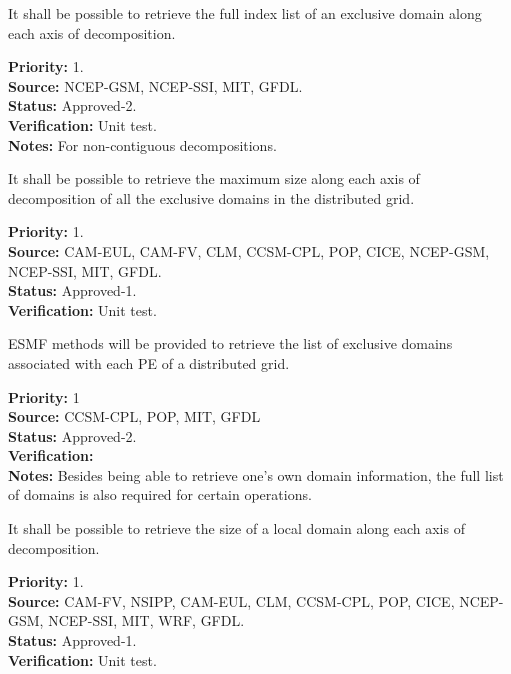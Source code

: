 It shall be possible to retrieve the full index list of 
an exclusive domain along each axis of decomposition.

\begin{reqlist}
{\bf Priority:} 1. \\ 
{\bf Source:} NCEP-GSM, NCEP-SSI, MIT, GFDL. \\
{\bf Status:} Approved-2. \\
{\bf Verification:} Unit test.\\
{\bf Notes:} For non-contiguous decompositions.
\end{reqlist}


It shall be possible to retrieve the maximum size along each axis of
decomposition of all the exclusive domains in the distributed grid. 

\begin{reqlist}
{\bf Priority:} 1. \\ 
{\bf Source:} CAM-EUL, CAM-FV, CLM, CCSM-CPL, POP, CICE, NCEP-GSM, NCEP-SSI, MIT, GFDL. \\
{\bf Status:} Approved-1. \\
{\bf Verification:} Unit test.
\end{reqlist}


ESMF methods will be provided to retrieve the list of exclusive
domains associated with each PE of a distributed grid.

\begin{reqlist}
{\bf Priority:} 1 \\ 
{\bf Source:} CCSM-CPL, POP, MIT, GFDL \\
{\bf Status:} Approved-2. \\
{\bf Verification:} \\
{\bf Notes:} Besides being able to retrieve one's own domain
  information, the full list of domains is also required for certain
  operations.
\end{reqlist}



It shall be possible to retrieve the size of a local domain
along each axis of decomposition.

\begin{reqlist}
{\bf Priority:} 1. \\ 
{\bf Source:} CAM-FV, NSIPP, CAM-EUL, CLM, CCSM-CPL, POP, CICE, NCEP-GSM, NCEP-SSI, MIT, WRF, GFDL. \\
{\bf Status:} Approved-1. \\
{\bf Verification:} Unit test.
\end{reqlist}

